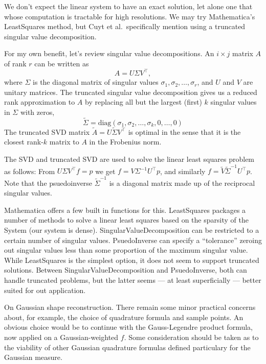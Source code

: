 \documentclass{amsart}
\theoremstyle{remark}
\numberwithin{equation}{section}
\begin{document}
We don't expect the linear system to have an exact solution, let alone one that whose computation is tractable for high resolutions. We may try Mathematica's LeastSquares method, but Cuyt et al.\ specifically mention using a truncated singular value decomposition.

For my own benefit, let's review singular value decompositions. An $i \times j$ matrix $A$ of rank $r$ can be written as 
\[
    A=U\Sigma V^\top,
\]
where $\Sigma$ is the diagonal matrix of singular values $\sigma_1, \sigma_2, \ldots, \sigma_r$, and $U$ and $V$ are unitary matrices. The truncated singular value decomposition gives us a reduced rank approximation to $A$ by replacing all but the largest (first) $k$ singular values in $\Sigma$ with zeros,
\[
    \tilde{\Sigma} = \text{diag}(\sigma_1, \sigma_2, \ldots, \sigma_k, 0, \ldots, 0)
\] 
The truncated SVD matrix $\tilde{A} = U \tilde{\Sigma} V^\top$ is optimal in the sense that it is the closest rank-$k$ matrix to $A$ in the Frobenius norm.

The SVD and truncated SVD are used to solve the linear least squares problem as follows: From $U\Sigma V^\top f = p$ we get $f=V \Sigma^{-1} U^\top p$, and similarly $f = \tilde{V} \tilde{\Sigma}^{-1} U^\top p$. Note that the psuedoinverse $\tilde\Sigma^{-1}$ is a diagonal matrix made up of the reciprocal singular values.

Mathematica offers a few built in functions for this. LeastSquares packages a number of methods to solve a linear least squares based on the sparsity of the System (our system is dense). SingularValueDecomposition can be restricted to a certain number of singular values. PsuedoInverse can specify a ``tolerance'' zeroing out singular values less than some proportion of  the maximum singular value. While LeastSquares is the simplest option, it does not seem to support truncated solutions. Between SingularValueDecomposition and PsuedoInverse, both can handle truncated problems, but the latter seems — at least superficially — better suited for out application.

On Gaussian shape reconstruction. There remain some minor practical concerns about, for example, the choice of quadrature formula and sample points. An obvious choice would be to continue with the Gauss-Legendre product formula, now applied on a Gaussian-weighted $f$. Some consideration should be taken as to the viability of other Gaussian quadrature formulas defined particulary for the Gaussian measure. 
\end{document}
